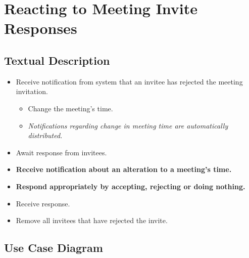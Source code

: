 \documentclass{article}
\begin{document}
\section{Reacting to Meeting Invite Responses}

\subsection{Textual Description}

\begin{itemize}
\item Receive notification from system that an invitee has rejected the
meeting invitation.

\begin{itemize}
\item Change the meeting's time.

\item \textit{Notifications regarding change in meeting time are
automatically distributed.}
\end{itemize}

\item Await response from invitees.

\item \textbf{Receive notification about an alteration to a meeting's time.}

\item \textbf{Respond appropriately by accepting, rejecting or doing nothing.%
}

\item Receive response.

\item Remove all invitees that have rejected the invite.
\end{itemize}

\subsection{Use Case Diagram}
\end{document}
